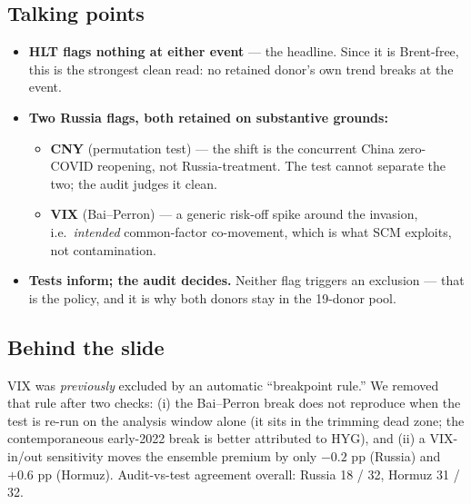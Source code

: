 \documentclass[11pt,a4paper]{article}
\newcommand{\highlight}[1]{\textcolor{accent}{\textbf{#1}}}
\begin{document}
\subsection{Talking points}
\begin{itemize}
  \item \highlight{HLT flags nothing at either event} --- the headline. Since it is Brent-free, this is
    the strongest clean read: no retained donor's own trend breaks at the event.
  \item \highlight{Two Russia flags, both retained on substantive grounds:}
    \begin{itemize}
      \item \highlight{CNY} (permutation test) --- the shift is the concurrent China zero-COVID
        reopening, not Russia-treatment. The test cannot separate the two; the audit judges it clean.
      \item \highlight{VIX} (Bai--Perron) --- a generic risk-off spike around the invasion, i.e.\
        \emph{intended} common-factor co-movement, which is what SCM exploits, not contamination.
    \end{itemize}
  \item \highlight{Tests inform; the audit decides.} Neither flag triggers an exclusion --- that is the
    policy, and it is why both donors stay in the 19-donor pool.
\end{itemize}

\subsection{Behind the slide}
VIX was \emph{previously} excluded by an automatic ``breakpoint rule.'' We removed that rule after
two checks: (i) the Bai--Perron break does not reproduce when the test is re-run on the analysis window
alone (it sits in the trimming dead zone; the contemporaneous early-2022 break is better attributed to
HYG), and (ii) a VIX-in/out sensitivity moves the ensemble premium by only $-0.2$ pp (Russia) and
$+0.6$ pp (Hormuz). Audit-vs-test agreement overall: Russia 18 / 32, Hormuz 31 / 32.
\end{document}
